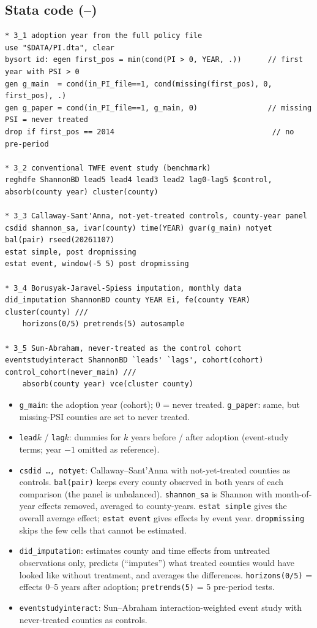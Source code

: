 \documentclass[11pt]{article}
\begin{document}
\subsection*{Stata code (--)}
\begin{lstlisting}
* 3_1 adoption year from the full policy file
use "$DATA/PI.dta", clear
bysort id: egen first_pos = min(cond(PI > 0, YEAR, .))      // first year with PSI > 0
gen g_main  = cond(in_PI_file==1, cond(missing(first_pos), 0, first_pos), .)
gen g_paper = cond(in_PI_file==1, g_main, 0)                // missing PSI = never treated
drop if first_pos == 2014                                    // no pre-period

* 3_2 conventional TWFE event study (benchmark)
reghdfe ShannonBD lead5 lead4 lead3 lead2 lag0-lag5 $control, absorb(county year) cluster(county)

* 3_3 Callaway-Sant'Anna, not-yet-treated controls, county-year panel
csdid shannon_sa, ivar(county) time(YEAR) gvar(g_main) notyet bal(pair) rseed(20261107)
estat simple, post dropmissing
estat event, window(-5 5) post dropmissing

* 3_4 Borusyak-Jaravel-Spiess imputation, monthly data
did_imputation ShannonBD county YEAR Ei, fe(county YEAR) cluster(county) ///
    horizons(0/5) pretrends(5) autosample

* 3_5 Sun-Abraham, never-treated as the control cohort
eventstudyinteract ShannonBD `leads' `lags', cohort(cohort) control_cohort(never_main) ///
    absorb(county year) vce(cluster county)
\end{lstlisting}
\begin{itemize}
\item \texttt{g\_main}: the adoption year (cohort); 0 = never treated. \texttt{g\_paper}: same, but missing-PSI counties are set to never treated.
\item \texttt{lead}$k$ / \texttt{lag}$k$: dummies for $k$ years before / after adoption (event-study terms; year $-1$ omitted as reference).
\item \texttt{csdid \dots, notyet}: Callaway--Sant'Anna with not-yet-treated counties as controls. \texttt{bal(pair)} keeps every county observed in both years of each comparison (the panel is unbalanced). \texttt{shannon\_sa} is Shannon with month-of-year effects removed, averaged to county-years. \texttt{estat simple} gives the overall average effect; \texttt{estat event} gives effects by event year. \texttt{dropmissing} skips the few cells that cannot be estimated.
\item \texttt{did\_imputation}: estimates county and time effects from untreated observations only, predicts (``imputes'') what treated counties would have looked like without treatment, and averages the differences. \texttt{horizons(0/5)} = effects 0--5 years after adoption; \texttt{pretrends(5)} = 5 pre-period tests.
\item \texttt{eventstudyinteract}: Sun--Abraham interaction-weighted event study with never-treated counties as controls.
\end{itemize}
\end{document}
